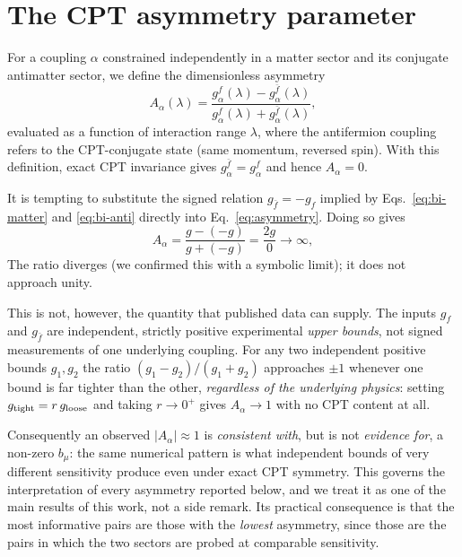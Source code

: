 \documentclass[
  aps,
  prd,
  reprint,
  amsmath,
  amssymb,
  nofootinbib,
  superscriptaddress,
  floatfix
]{revtex4-2}
\newcommand{\Aalpha}{A_\alpha}
\begin{document}
\section{The CPT asymmetry parameter}
\label{sec:asymmetry}

For a coupling $\alpha$ constrained independently in a matter sector and
its conjugate antimatter sector, we define the dimensionless asymmetry
\begin{equation}
  \Aalpha(\lambda)
  = \frac{g_\alpha^{f}(\lambda)-g_\alpha^{\bar f}(\lambda)}
         {g_\alpha^{f}(\lambda)+g_\alpha^{\bar f}(\lambda)},
  \label{eq:asymmetry}
\end{equation}
evaluated as a function of interaction range $\lambda$, where the
antifermion coupling refers to the CPT-conjugate state (same momentum,
reversed spin). With this definition, exact CPT invariance gives
$g^{\bar f}_\alpha=g^f_\alpha$ and hence $\Aalpha=0$.

It is tempting to substitute the signed relation $g_{\bar f}=-g_f$ implied
by Eqs.~\eqref{eq:bi-matter} and \eqref{eq:bi-anti} directly into
Eq.~\eqref{eq:asymmetry}. Doing so gives
\begin{equation}
  \Aalpha = \frac{g-(-g)}{g+(-g)} = \frac{2g}{0}\longrightarrow\infty,
  \label{eq:divergence}
\end{equation}
The ratio diverges (we confirmed this with a symbolic limit); it does not
approach unity.

This is not, however, the quantity that published data can supply. The
inputs $g_f$ and $g_{\bar f}$ are independent, strictly positive
experimental \emph{upper bounds}, not signed measurements of one
underlying coupling. For any two independent positive bounds $g_1,g_2$ the
ratio $(g_1-g_2)/(g_1+g_2)$ approaches $\pm1$ whenever one bound is far
tighter than the other, \emph{regardless of the underlying physics}:
setting $g_{\rm tight}=r\,g_{\rm loose}$ and taking $r\to0^+$ gives
$\Aalpha\to1$ with no CPT content at all.

Consequently an observed $|\Aalpha|\approx1$ is \emph{consistent with},
but is not \emph{evidence for}, a non-zero $b_\mu$: the same numerical
pattern is what independent bounds of very different sensitivity produce
even under exact CPT symmetry. This governs the interpretation of every
asymmetry reported below, and we treat it as one of the main results of
this work, not a side remark. Its practical consequence is that the most
informative pairs are those with the \emph{lowest} asymmetry, since those
are the pairs in which the two sectors are probed at comparable
sensitivity.
\end{document}
